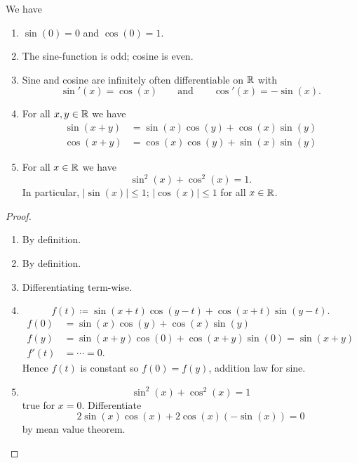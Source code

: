 \documentclass[10pt, a4paper]{article}
\begin{document}
\begin{theorem}
    We have
    \begin{enumerate}[label = (\roman*)]
        \item $\sin(0) = 0$ and $\cos(0) = 1$.

        \item The sine-function is odd;
        cosine is even.

        \item Sine and cosine are infinitely often differentiable on $\mathbb{R}$ with
        \[
        \sin'(x) = \cos(x)\qquad\text{and}\qquad\cos'(x) = -\sin(x).
        \]

        \item For all $x, y \in \mathbb{R}$ we have
        \begin{align*}
            \sin(x + y) &= \sin(x)\cos(y) + \cos(x)\sin(y) \\
            \cos(x + y) &= \cos(x)\cos(y) + \sin(x)\sin(y)
        \end{align*}

        \item For all $x \in \mathbb{R}$ we have
        \[
        \sin ^ 2(x) + \cos ^ 2(x) = 1.
        \]
        In particular,
        $|\sin(x)| \leq 1$;
        $|\cos(x)| \leq 1$ for all $x \in \mathbb{R}$.
    \end{enumerate}

    \begin{proof}\phantom{}
        \begin{enumerate}[label = (\roman*)]
            \item By definition.
            
            \item By definition.

            \item Differentiating term-wise.

            \item
            \[
            f(t) \coloneqq \sin(x + t)\cos(y - t) + \cos(x + t)\sin(y - t).
            \]
            \begin{align*}
                f(0) &= \sin(x)\cos(y) + \cos(x)\sin(y) \\
                f(y) &= \sin(x + y)\cos(0) + \cos(x + y)\sin(0) = \sin(x + y) \\
                f'(t) &= \dotsi = 0.
            \end{align*}
            Hence $f(t)$ is constant so $f(0) = f(y)$,
            addition law for sine.

            \item
            \[
            \sin ^ 2(x) + \cos ^ 2(x) = 1
            \]
            true for $x = 0$.
            Differentiate
            \[
            2\sin(x)\cos(x) + 2\cos(x)(-\sin(x)) = 0
            \]
            by mean value theorem.
        \end{enumerate}
    \end{proof}
\end{theorem}
\end{document}
